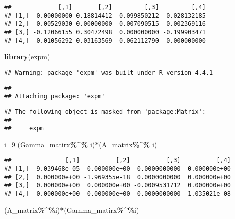 \documentclass[
]{article}
\newenvironment{Shaded}{\begin{snugshade}}{\end{snugshade}}
\newcommand{\DecValTok}[1]{\textcolor[rgb]{0.00,0.00,0.81}{#1}}
\newcommand{\FunctionTok}[1]{\textcolor[rgb]{0.13,0.29,0.53}{\textbf{#1}}}
\newcommand{\NormalTok}[1]{#1}
\newcommand{\OtherTok}[1]{\textcolor[rgb]{0.56,0.35,0.01}{#1}}
\newcommand{\SpecialCharTok}[1]{\textcolor[rgb]{0.81,0.36,0.00}{\textbf{#1}}}
\begin{document}
\begin{verbatim}
##             [,1]       [,2]         [,3]         [,4]
## [1,]  0.00000000 0.18814412 -0.099850212 -0.028132185
## [2,]  0.00529030 0.00000000  0.007090515  0.002369116
## [3,] -0.12066155 0.30472498  0.000000000 -0.199903471
## [4,] -0.01056292 0.03163569 -0.062112790  0.000000000
\end{verbatim}

\begin{Shaded}
\begin{Highlighting}[]
\FunctionTok{library}\NormalTok{(expm)}
\end{Highlighting}
\end{Shaded}

\begin{verbatim}
## Warning: package 'expm' was built under R version 4.4.1
\end{verbatim}

\begin{verbatim}
## 
## Attaching package: 'expm'
\end{verbatim}

\begin{verbatim}
## The following object is masked from 'package:Matrix':
## 
##     expm
\end{verbatim}

\begin{Shaded}
\begin{Highlighting}[]
\NormalTok{i}\OtherTok{=}\DecValTok{9}
\NormalTok{(Gamma\_matirx}\SpecialCharTok{\%\^{}\%}\NormalTok{ i)}\SpecialCharTok{*}\NormalTok{(A\_matrix}\SpecialCharTok{\%\^{}\%}\NormalTok{ i)}
\end{Highlighting}
\end{Shaded}

\begin{verbatim}
##               [,1]          [,2]          [,3]          [,4]
## [1,] -9.039468e-05  0.000000e+00  0.0000000000  0.000000e+00
## [2,]  0.000000e+00 -1.969355e-18  0.0000000000  0.000000e+00
## [3,]  0.000000e+00  0.000000e+00 -0.0009531712  0.000000e+00
## [4,]  0.000000e+00  0.000000e+00  0.0000000000 -1.035021e-08
\end{verbatim}

\begin{Shaded}
\begin{Highlighting}[]
\NormalTok{(A\_matrix}\SpecialCharTok{\%\^{}\%}\NormalTok{i)}\SpecialCharTok{*}\NormalTok{(Gamma\_matirx}\SpecialCharTok{\%\^{}\%}\NormalTok{i)}
\end{Highlighting}
\end{Shaded}
\end{document}
